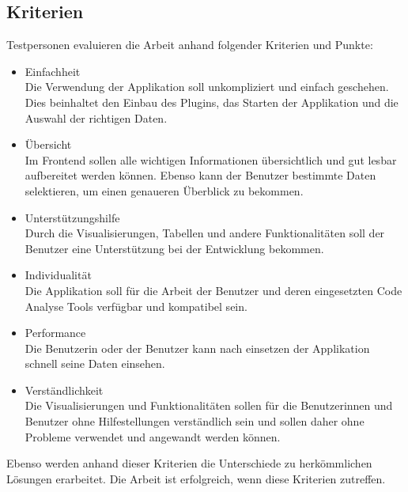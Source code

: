 \subsection{Kriterien} 
Testpersonen evaluieren die Arbeit anhand folgender Kriterien und Punkte:
\begin{itemize}
\item Einfachheit \\ Die Verwendung der Applikation soll unkompliziert und einfach geschehen. Dies beinhaltet den Einbau des Plugins, das Starten der Applikation und die Auswahl der richtigen Daten.
\item Übersicht \\ Im Frontend sollen alle wichtigen Informationen übersichtlich und gut lesbar aufbereitet werden können. Ebenso kann der Benutzer bestimmte Daten selektieren, um einen genaueren Überblick zu bekommen.
\item Unterstützungshilfe \\ Durch die Visualisierungen, Tabellen und andere Funktionalitäten soll der Benutzer eine Unterstützung bei der Entwicklung bekommen.
\item Individualität \\ Die Applikation soll für die Arbeit der Benutzer und deren eingesetzten Code Analyse Tools verfügbar und kompatibel sein. 
\item Performance \\ Die Benutzerin oder der Benutzer kann nach einsetzen der Applikation schnell seine Daten einsehen.
\item Verständlichkeit \\ Die Visualisierungen und Funktionalitäten sollen für die Benutzerinnen und Benutzer ohne Hilfestellungen verständlich sein und sollen daher ohne Probleme verwendet und angewandt werden können.
\end{itemize}

Ebenso werden anhand dieser Kriterien die Unterschiede zu herkömmlichen Lösungen erarbeitet. Die Arbeit ist erfolgreich, wenn diese Kriterien zutreffen. 

